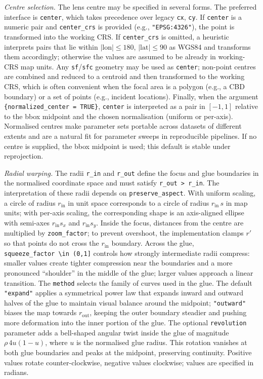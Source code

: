 \emph{Centre selection.} The lens centre may be specified in several forms. The preferred interface
is \texttt{center}, which takes precedence over legacy \texttt{cx}, \texttt{cy}. If \texttt{center} is a
numeric pair and \texttt{center\_crs} is provided (e.g., \texttt{"EPSG:4326"}), the point is transformed
into the working CRS. If \texttt{center\_crs} is omitted, a heuristic interprets pairs that lie within
\(|\text{lon}|\le 180\), \(|\text{lat}|\le 90\) as WGS84 and transforms them accordingly; otherwise
the values are assumed to be already in working-CRS map units. Any \texttt{sf}/\texttt{sfc} geometry may
be used as \texttt{center}; non-point centres are combined and reduced to a centroid and then
transformed to the working CRS, which is often convenient when the focal area is a polygon (e.g., a
CBD boundary) or a set of points (e.g., incident locations). Finally, when the argument \texttt{\{normalized\_center\ =\ TRUE\}}, \texttt{center} is interpreted as a pair in \([-1,1]\) relative to the bbox midpoint and the
chosen normalisation (uniform or per-axis). Normalised centres make parameter sets portable across
datasets of different extents and are a natural fit for parameter sweeps in reproducible pipelines.
If no centre is supplied, the bbox midpoint is used; this default is stable under reprojection.

\emph{Radial warping.} The radii \texttt{r\_in} and \texttt{r\_out} define the focus and glue boundaries
in the normalised coordinate space and must satisfy \texttt{r\_out\ \textgreater{}\ r\_in}. The interpretation of these
radii depends on \texttt{preserve\_aspect}. With uniform scaling, a circle of radius \(r_{\text{in}}\)
in unit space corresponds to a circle of radius \(r_{\text{in}}\,s\) in map units; with per-axis
scaling, the corresponding shape is an axis-aligned ellipse with semi-axes \(r_{\text{in}}s_x\) and
\(r_{\text{in}}s_y\). Inside the focus, distances from the centre are multiplied by
\texttt{zoom\_factor}; to prevent overshoot, the implementation clamps \(r'\) so that points do not cross
the \(r_{\text{in}}\) boundary. Across the glue, \texttt{squeeze\_factor\ \textbackslash{}in\ (0,1{]}} controls how strongly
intermediate radii compress: smaller values create tighter compression near the boundaries and a
more pronounced ``shoulder'' in the middle of the glue; larger values approach a linear transition. The
\texttt{method} selects the family of curves used in the glue. The default \texttt{"expand"} applies a
symmetrical power law that expands inward and outward halves of the glue to maintain visual balance
around the midpoint; \texttt{"outward"} biases the map towards \(r_{\text{out}}\), keeping the outer
boundary steadier and pushing more deformation into the inner portion of the glue. The optional
\texttt{revolution} parameter adds a bell-shaped angular twist inside the glue of magnitude
\(\rho\,4u(1-u)\), where \(u\) is the normalised glue radius. This rotation vanishes at both glue
boundaries and peaks at the midpoint, preserving continuity. Positive values rotate
counter-clockwise, negative values clockwise; values are specified in radians.

